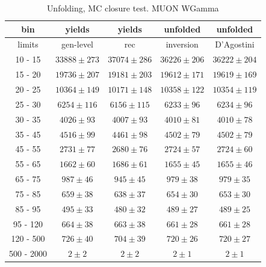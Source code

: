 \begin{table}[h]
  \scriptsize
  \begin{center}
  \caption{Unfolding, MC closure test. MUON WGamma}
  \begin{tabular}{|c|c|c|c|c|}
  bin &  yields &   yields &  unfolded &  unfolded \\ \hline
   limits &  gen-level & rec &  inversion &  D'Agostini \\ \hline
10 -  15 &     $33888\pm 273$ &     $37074\pm 286$ &     $36226\pm206$ &     $36222\pm204$ \\ \hline
 15 -  20 &     $19736\pm 207$ &     $19181\pm 203$ &     $19612\pm171$ &     $19619\pm169$ \\ \hline
 20 -  25 &     $10364\pm 149$ &     $10171\pm 148$ &     $10358\pm122$ &     $10354\pm119$ \\ \hline
 25 -  30 &     $6254\pm 116$ &     $6156\pm 115$ &     $6233\pm96$ &     $6234\pm96$ \\ \hline
 30 -  35 &     $4026\pm  93$ &     $4007\pm  93$ &     $4010\pm81$ &     $4010\pm78$ \\ \hline
 35 -  45 &     $4516\pm  99$ &     $4461\pm  98$ &     $4502\pm79$ &     $4502\pm79$ \\ \hline
 45 -  55 &     $2731\pm  77$ &     $2680\pm  76$ &     $2724\pm57$ &     $2724\pm60$ \\ \hline
 55 -  65 &     $1662\pm  60$ &     $1686\pm  61$ &     $1655\pm45$ &     $1655\pm46$ \\ \hline
 65 -  75 &     $987\pm  46$ &     $945\pm  45$ &     $979\pm38$ &     $979\pm35$ \\ \hline
 75 -  85 &     $659\pm  38$ &     $638\pm  37$ &     $654\pm30$ &     $653\pm30$ \\ \hline
 85 -  95 &     $495\pm  33$ &     $480\pm  32$ &     $489\pm27$ &     $489\pm25$ \\ \hline
 95 - 120 &     $664\pm  38$ &     $663\pm  38$ &     $661\pm28$ &     $661\pm28$ \\ \hline
120 - 500 &     $726\pm  40$ &     $704\pm  39$ &     $720\pm26$ &     $720\pm27$ \\ \hline
500 - 2000 &     $2\pm   2$ &     $2\pm   2$ &     $2\pm1$ &     $2\pm1$ \\ \hline
  \end{tabular}
  \label{tab:unf_mc_closure_MUON_WGamma}
  \end{center}
\end{table}

